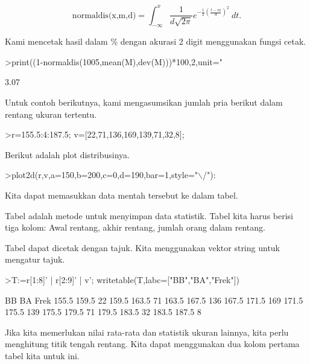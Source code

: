 \documentclass[a4paper,10pt]{article}
\begin{document}
\begin{eulernotebook}
\begin{eulercomment}
\end{eulercomment}
\begin{eulerformula}
\[
\text{normaldis(x,m,d)}=\int_{-\infty}^x \frac{1}{d\sqrt{2\pi}}e^{-\frac{1}{2}(\frac{t-m}{d})^2}\ dt.
\]
\end{eulerformula}
\begin{eulercomment}
Kami mencetak hasil dalam \% dengan akurasi 2 digit menggunakan fungsi
cetak.
\end{eulercomment}
\begin{eulerprompt}
>print((1-normaldis(1005,mean(M),dev(M)))*100,2,unit=" %
\end{eulerprompt}
\begin{euleroutput}
        3.07 %
\end{euleroutput}
\begin{eulercomment}
Untuk contoh berikutnya, kami mengasumsikan jumlah pria berikut dalam
rentang ukuran tertentu.
\end{eulercomment}
\begin{eulerprompt}
>r=155.5:4:187.5; v=[22,71,136,169,139,71,32,8];
\end{eulerprompt}
\begin{eulercomment}
Berikut adalah plot distribusinya.
\end{eulercomment}
\begin{eulerprompt}
>plot2d(r,v,a=150,b=200,c=0,d=190,bar=1,style="\(\backslash\)/"):
\end{eulerprompt}
\begin{eulercomment}
Kita dapat memasukkan data mentah tersebut ke dalam tabel.

Tabel adalah metode untuk menyimpan data statistik. Tabel kita harus
berisi tiga kolom: Awal rentang, akhir rentang, jumlah orang dalam
rentang.

Tabel dapat dicetak dengan tajuk. Kita menggunakan vektor string untuk
mengatur tajuk.
\end{eulercomment}
\begin{eulerprompt}
>T:=r[1:8]' | r[2:9]' | v'; writetable(T,labc=["BB","BA","Frek"])
\end{eulerprompt}
\begin{euleroutput}
          BB        BA      Frek
       155.5     159.5        22
       159.5     163.5        71
       163.5     167.5       136
       167.5     171.5       169
       171.5     175.5       139
       175.5     179.5        71
       179.5     183.5        32
       183.5     187.5         8
\end{euleroutput}
\begin{eulercomment}
Jika kita memerlukan nilai rata-rata dan statistik ukuran lainnya,
kita perlu menghitung titik tengah rentang. Kita dapat menggunakan dua
kolom pertama tabel kita untuk ini.


\end{eulercomment}
\end{eulernotebook}
\end{document}
